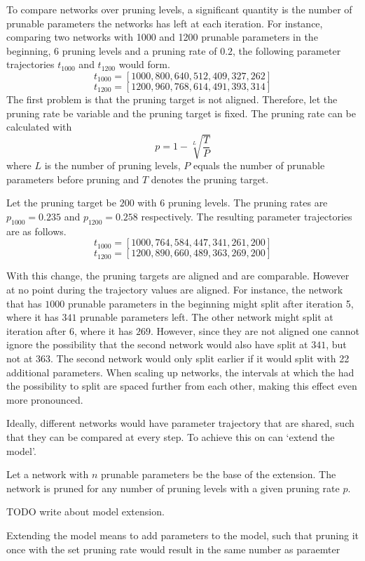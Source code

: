 To compare networks over pruning levels, a significant quantity is the number of prunable parameters the networks has left at each iteration.
For instance, comparing two networks with 1000 and 1200 prunable parameters in the beginning, 6 pruning levels and a pruning rate of $0.2$, the following parameter trajectories $t_{1000}$ and $t_{1200}$ would form.
\[
t_{1000} = [1000, 800, 640, 512, 409, 327, 262]
\]
\[
t_{1200} = [1200, 960, 768, 614, 491, 393, 314]
\]
The first problem is that the pruning target is not aligned.
Therefore, let the pruning rate be variable and the pruning target is fixed.
The pruning rate can be calculated with 
\[
p = 1 - \sqrt[L]{\frac{T}{P}}
\]
where $L$ is the number of pruning levels, $P$ equals the number of prunable parameters before pruning and $T$ denotes the pruning target.

Let the pruning target be $200$ with 6 pruning levels.
The pruning rates are $p_{1000} = 0.235$ and $p_{1200} = 0.258$ respectively.
The resulting parameter trajectories are as follows.
\[
t_{1000} = [1000, 764, 584, 447, 341, 261, 200]
\]
\[
t_{1200} = [1200, 890, 660, 489, 363, 269, 200]
\]

With this change, the pruning targets are aligned and are comparable.
However at no point during the trajectory values are aligned.
For instance, the network that has $1000$ prunable parameters in the beginning might split after iteration 5, where it has $341$ prunable parameters left. 
The other network might split at iteration after 6, where it has $269$.
However, since they are not aligned one cannot ignore the possibility that the second network would also have split at $341$, but not at $363$. 
The second network would only split earlier if it would split with 22 additional parameters.
When scaling up networks, the intervals at which the had the possibility to split are spaced further from each other, making this effect even more pronounced.

Ideally, different networks would have parameter trajectory that are shared, such that they can be compared at every step.
To achieve this on can `extend the model'.

Let a network with $n$ prunable parameters be the base of the extension.
The network is pruned for any number of pruning levels with a given pruning rate $p$.

TODO write about model extension.

Extending the model means to add parameters to the model, such that pruning it once with the set pruning rate would result in the same number as paraemter

